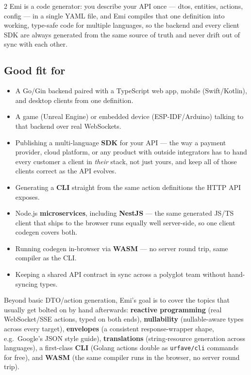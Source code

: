 \documentclass[10pt,a4paper]{extarticle}
\begin{document}
\begin{multicols}{2}
\raggedcolumns
Emi is a code generator: you describe your API once --- dtos, entities,
actions, config --- in a single YAML file, and Emi compiles that one
definition into working, type-safe code for multiple languages, so the
backend and every client SDK are always generated from the same source of
truth and never drift out of sync with each other.

\subsection*{Good fit for}
\begin{itemize}[leftmargin=1.3em,itemsep=2pt,topsep=2pt]
  \item A Go/Gin backend paired with a TypeScript web app, mobile
    (Swift/Kotlin), and desktop clients from one definition.
  \item A game (Unreal Engine) or embedded device (ESP-IDF/Arduino)
    talking to that backend over real WebSockets.
  \item Publishing a multi-language \textbf{SDK} for your API --- the way a
    payment provider, cloud platform, or any product with outside
    integrators has to hand every customer a client in \emph{their}
    stack, not just yours, and keep all of those clients correct as the
    API evolves.
  \item Generating a \textbf{CLI} straight from the same action
    definitions the HTTP API exposes.
  \item Node.js \textbf{microservices}, including \textbf{NestJS} --- the
    same generated JS/TS client that ships to the browser runs equally
    well server-side, so one client codegen covers both.
  \item Running codegen in-browser via \textbf{WASM} --- no server round
    trip, same compiler as the CLI.
  \item Keeping a shared API contract in sync across a polyglot team
    without hand-syncing types.
\end{itemize}

Beyond basic DTO/action generation, Emi's goal is to cover the topics that
usually get bolted on by hand afterwards: \textbf{reactive programming}
(real WebSocket/SSE actions, typed on both ends), \textbf{nullability}
(nullable-aware types across every target), \textbf{envelopes} (a
consistent response-wrapper shape, e.g.\ Google's JSON style guide),
\textbf{translations} (string-resource generation across languages), a
first-class \textbf{CLI} (Golang actions double as \texttt{urfave/cli}
commands for free), and \textbf{WASM} (the same compiler runs in the
browser, no server round trip).


\end{multicols}
\end{document}
